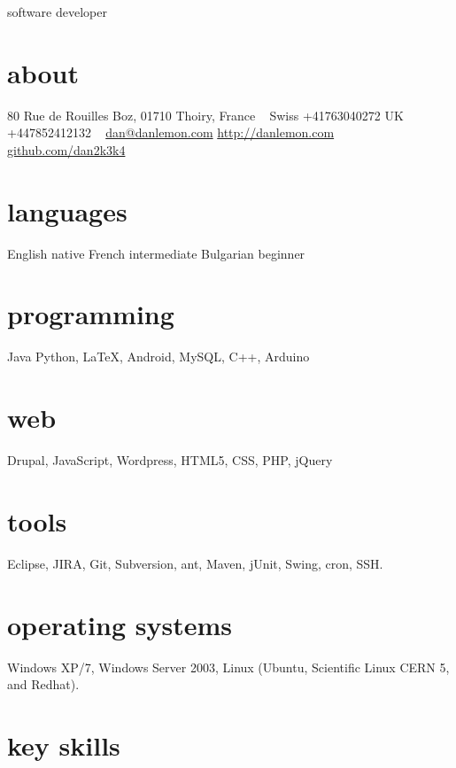 \documentclass[]{friggeri-cv}
\begin{document}
       {software developer}


\begin{aside}
  \section{about}
  80 Rue de Rouilles Boz,
  01710 Thoiry,
  France
    ~
    Swiss +41763040272
    UK +447852412132
    ~
    \href{mailto:dan@danlemon.com}{dan@danlemon.com}
    \href{http://danlemon.com}{http://danlemon.com}
    \href{http://github.com/dan2k3k4}{github.com/dan2k3k4}
  \section{languages}
    English native
    French intermediate
    Bulgarian beginner
  \section{programming}
  Java
    Python, \LaTeX, Android, MySQL, C++, Arduino
  \section{web}
    Drupal, JavaScript, Wordpress, HTML5, CSS, PHP, jQuery
  \section{tools}
    Eclipse, JIRA, Git, Subversion, ant, Maven, jUnit, Swing, cron, SSH.
  \section{operating systems}
    Windows XP/7, Windows Server 2003, Linux (Ubuntu, Scientific Linux CERN 5, and Redhat).
\end{aside}



\section{key skills}
\end{document}
